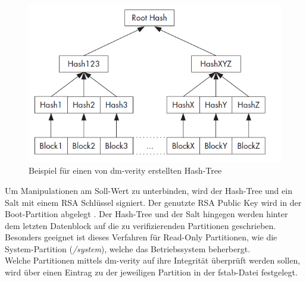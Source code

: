 	\begin{figure}[h]
		\centering
		\includegraphics[width=0.7\linewidth]{android_pages/graphics/dm_verity_hash_tree.png}
		\caption{Beispiel für einen von dm-verity erstellten Hash-Tree \cite[S. 255]{Drake2014}}
		\label{fig:dm-verity-table}
	\end{figure}
	
	Um Manipulationen am Soll-Wert zu unterbinden, wird der Hash-Tree und ein Salt
	mit einem RSA Schlüssel signiert. Der genutzte RSA Public Key wird in der
	Boot-Partition abgelegt \cite[S. 255]{Drake2014}. Der Hash-Tree und der Salt
	hingegen werden hinter dem letzten Datenblock auf die zu verifizierenden
	Partitionen geschrieben. Besonders geeignet ist dieses Verfahren für Read-Only
	Partitionen, wie die System-Partition (\textit{/system}), welche das
	Betriebssystem beherbergt.\\
	Welche Partitionen mittels dm-verity auf ihre Integrität überprüft werden
	sollen, wird über einen Eintrag zu der jeweiligen Partition in der fstab-Datei
	festgelegt.

